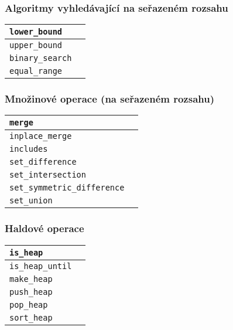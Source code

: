 \begin{frame}[fragile]
\frametitle{Algoritmy vyhledávající na seřazeném rozsahu}
\begin{block}{}
\centering
\begin{tabular}{ll}
\lstinline|lower_bound| & \\
\hline
\lstinline|upper_bound| &  \\
\hline
\lstinline|binary_search| &  \\
\hline
\lstinline|equal_range| &  \\
\end{tabular}
\end{block}
\end{frame}



\begin{frame}[fragile]
\frametitle{Množinové operace (na seřazeném rozsahu)}
\begin{block}{}
\centering
\begin{tabular}{ll}
\lstinline|merge| &  \\
\hline
\lstinline|inplace_merge| &  \\
\hline
\lstinline|includes| &  \\
\hline
\lstinline|set_difference| &  \\
\hline
\lstinline|set_intersection| &  \\
\hline
\lstinline|set_symmetric_difference| &  \\
\hline
\lstinline|set_union| & \\
\end{tabular}
\end{block}
\end{frame}



\begin{frame}[fragile]
\frametitle{Haldové operace}
\begin{block}{}
\centering
\begin{tabular}{ll}
\lstinline|is_heap| &  \\
\hline
\lstinline|is_heap_until| &  \\
\hline
\lstinline|make_heap| & \\
\hline
\lstinline|push_heap| &  \\
\hline
\lstinline|pop_heap| & \\
\hline
\lstinline|sort_heap| & \\
\end{tabular}
\end{block}
\end{frame}


